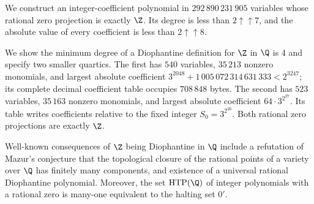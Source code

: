 We construct an integer-coefficient polynomial in
$292\,890\,231\,905$ variables whose rational zero projection is exactly
$\Z$. Its degree is less than $2\mathbin{\uparrow\!\uparrow}7$, and the
absolute value of every coefficient is less than
$2\mathbin{\uparrow\!\uparrow}8$.

We show the minimum degree of a Diophantine definition for $\Z$ in $\Q$
is 4 and specify two smaller quartics. The first has $540$ variables,
$35\,213$ nonzero monomials, and largest absolute coefficient
$3^{2048}+1\,005\,072\,314\,631\,333<2^{3247}$; its complete decimal
coefficient table occupies $708\,848$ bytes. The second has $523$ variables,
$35\,163$ nonzero monomials, and largest absolute coefficient
$64\cdot3^{2^{27}}$. Its table writes coefficients relative to the fixed
integer $S_0=3^{2^{26}}$. Both rational zero projections are exactly $\Z$.

Well-known consequences of $\Z$ being Diophantine in $\Q$ include a refutation of Mazur's conjecture that the topological closure of the rational points of a variety over $\Q$ has finitely many components, and existence of a universal rational Diophantine polynomial. Moreover, the set $\operatorname{HTP}(\Q)$ of integer polynomials with a rational zero is many-one equivalent to the halting set $0'$.
